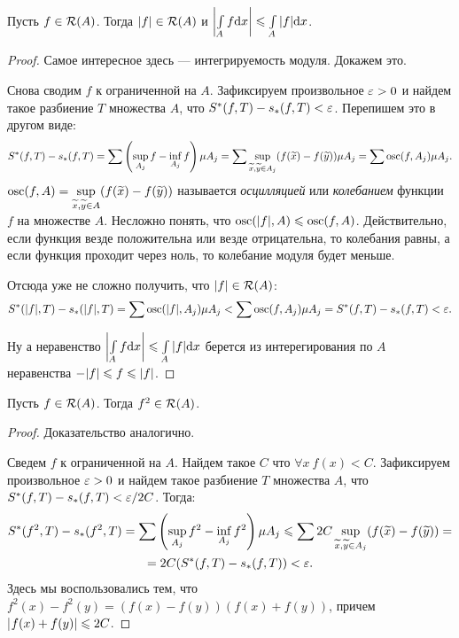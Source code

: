 \begin{Statement}
Пусть $f \in \mathcal{R}(A)$. Тогда $|f| \in \mathcal{R}(A)$ и $\left|\int\limits_A f\mathrm{d}x \right| \leqslant \int\limits_A |f|\mathrm{d}x$.
\end{Statement}
\begin{proof}
Самое интересное здесь --- интегрируемость модуля. Докажем это.

Снова сводим $f$ к ограниченной на $A$. Зафиксируем произвольное $\varepsilon > 0$ и найдем такое разбиение $T$ множества $A$, что $S^*(f, T) - s_*(f, T) < \varepsilon$. Перепишем это в другом виде:
\begin{gather*}
S^*(f, T) - s_*(f, T) =  \sum\left( \sup\limits_{A_j}f - \inf\limits_{A_j}f \right)\mu A_j = \sum\sup\limits_{\widetilde{x}, \widetilde{y} \in A_j}(f(\widetilde{x}) - f(\widetilde{y})) \mu A_j = \sum\mathrm{osc}(f, A_j)\mu A_j.
\end{gather*}
$\mathrm{osc}(f, A) = \sup\limits_{\widetilde{x}, \widetilde{y} \in A}(f(\widetilde{x}) - f(\widetilde{y}))$ называется \textit{осцилляцией} или \textit{колебанием} функции $f$ на  множестве $A$. Несложно понять, что $\mathrm{osc}(|f|, A) \leqslant \mathrm{osc}(f, A)$. Действительно, если функция везде положительна или везде отрицательна, то колебания равны, а если функция проходит через ноль, то колебание модуля будет меньше.

Отсюда уже не сложно получить, что $|f| \in \mathcal{R}(A)$:
\begin{gather*}
S^*(|f|, T) - s_*(|f|, T) =  \sum\mathrm{osc}(|f|, A_j)\mu A_j < \sum\mathrm{osc}(f, A_j)\mu A_j = S^*(f, T) - s_*(f, T) < \varepsilon.
\end{gather*}

Ну а неравенство $\left|\int\limits_A f\mathrm{d}x \right| \leqslant \int\limits_A |f|\mathrm{d}x$ берется из интерегирования по $A$ неравенства $-|f| \leq f\hm\leq|f|$.
\end{proof}

\begin{Statement}
Пусть $f \in \mathcal{R}(A)$. Тогда $f^2 \in \mathcal{R}(A)$.
\end{Statement}
\begin{proof}
Доказательство аналогично.

Сведем $f$ к ограниченной на $A$. Найдем такое $C$ что $\forall x\ f(x) < C$. Зафиксируем произвольное $\varepsilon > 0$ и найдем такое разбиение $T$ множества $A$, что $S^*(f, T) - s_*(f, T) < \varepsilon / 2C$. Тогда:
\begin{gather*}
S^*(f^2, T) - s_*(f^2, T) = \sum\left( \sup\limits_{A_j}f^2 - \inf\limits_{A_j}f^2 \right)\mu A_j \leqslant \sum 2C\sup\limits_{\widetilde{x}, \widetilde{y} \in A_j}(f(\widetilde{x}) - f(\widetilde{y})) =\\= 2C (S^*(f, T) - s_*(f, T)) < \varepsilon.
\end{gather*}
Здесь мы воспользовались тем, что $f^2(x) - f^2(y) = (f(x) - f(y))(f(x) + f(y))$, причем\\|$f(x) + f(y)| \hm\leq 2C$.
\end{proof}

